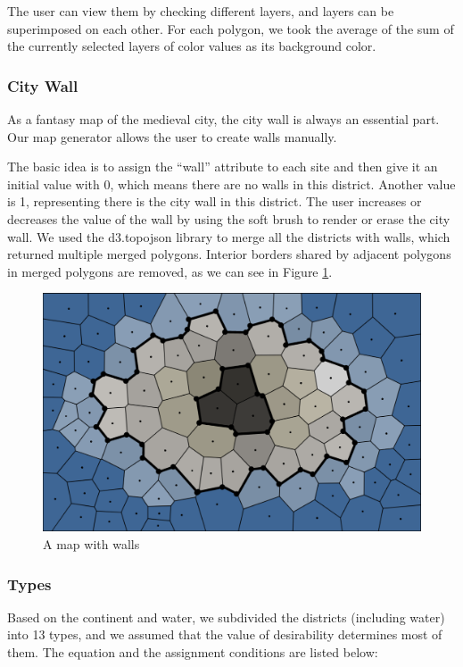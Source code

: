 The user can view them by checking different layers, and layers can be superimposed on each other. For each polygon, we took the average of the sum of the currently selected layers of color values as its background color.

\subsubsection{City Wall}
As a fantasy map of the medieval city, the city wall is always an essential part. Our map generator allows the user to create walls manually.

The basic idea is to assign the ``wall'' attribute to each site and then give it an initial value with 0, which means there are no walls in this district. Another value is 1, representing there is the city wall in this district. The user increases or decreases the value of the wall by using the soft brush to render or erase the city wall. We used the d3.topojson library to merge all the districts with walls, which returned multiple merged polygons. Interior borders shared by adjacent polygons in merged polygons are removed, as we can see in Figure \ref{fig:city wall}.

\begin{figure}[htbp]
  \includegraphics[width=\textwidth]{section04/assets/Map-wall.png}
  \caption{A map with walls}
  \label{fig:city wall}
\end{figure}

\subsubsection{Types}
Based on the continent and water, we subdivided the districts (including water) into 13 types, and we assumed that the value of desirability determines most of them. The equation and the assignment conditions are listed below:

